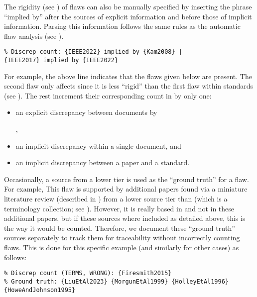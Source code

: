 The rigidity (see ) of flaws can also be manually
specified by inserting the phrase ``implied by'' after the sources of explicit
information and before those of implicit information. Parsing this information
follows the same rules as the automatic flaw analysis
(see ).
\begin{displayquote}
    \texttt{\% Discrep count: \{IEEE2022\} implied by \{Kam2008\} |\\
        \displayNL \{IEEE2017\} implied by \{IEEE2022\}}
\end{displayquote}
For example, the above line indicates that the flaws given below are
present. The second flaw only affects  since it
is less ``rigid'' than the first flaw within standards (see ).
The rest increment their corresponding count in
 by only one:
\begin{itemize}
    \item an explicit discrepancy between documents by
          \begin{NoHyper}\citeauthor{IEEE2022}\end{NoHyper},
    \item an implicit discrepancy within a single document, and
    \item an implicit discrepancy between a paper and a standard.
\end{itemize}

Occasionally, a source from a lower tier is used as the ``ground truth'' for a
flaw. For example, \tolTestFlaw*{} This flaw is supported
by additional papers found via a miniature literature review (described in
) from a lower source tier than \citep{Firesmith2015}
(which is a terminology collection; see ). However, it
is really based in \citep{Firesmith2015} and not in these
additional papers, but if these sources where included as detailed above,
this is the way it would be counted. Therefore, we document these ``ground
truth'' sources separately to track them for traceability without incorrectly
counting flaws. This is done for this specific example (and similarly
for other cases) as follows:
\begin{displayquote}
    \texttt{\% Discrep count (TERMS, WRONG): \{Firesmith2015\}\\
        \% Ground truth: \{LiuEtAl2023\} \{MorgunEtAl1999\} \{HolleyEtAl1996\}
        \displayNL \{HoweAndJohnson1995\}}
\end{displayquote}

